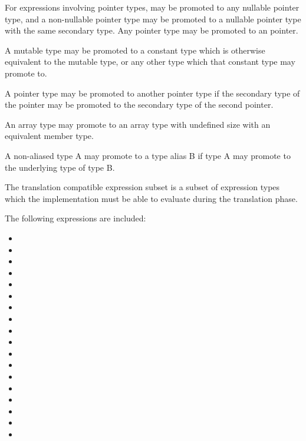 \specsubitem
For expressions involving pointer types,  may be promoted to any
nullable pointer type, and a non-nullable pointer type may be promoted to
a nullable pointer type with the same secondary type. Any pointer type may be
promoted to an  pointer.

\specsubitem
A mutable type may be promoted to a constant type which is otherwise equivalent
to the mutable type, or any other type which that constant type may promote to.

\specsubitem
A pointer type may be promoted to another pointer type if the secondary type of
the pointer may be promoted to the secondary type of the second pointer.

\specsubitem
An array type may promote to an array type with undefined size with an
equivalent member type.

\specsubitem
A non-aliased type A may promote to a type alias B if type A may promote to the
underlying type of type B.


The translation compatible expression subset is a subset of expression types
which the implementation must be able to evaluate during the translation phase.

\specsubitem
The following expressions are included:

\begin{minipage}[t][7cm][b]{\textwidth}
\begin{multicols}{2}
\begin{itemize}
\item {}
\item {}
\item {}
\item {}
\item {}
\item {}
\item {}
\item {}
\item {}
\item {}
\item {}
\item {}
\item {}
\item {}
\item {}
\item {}
\item {}
\item {}
\end{itemize}
\end{multicols}
\end{minipage}


